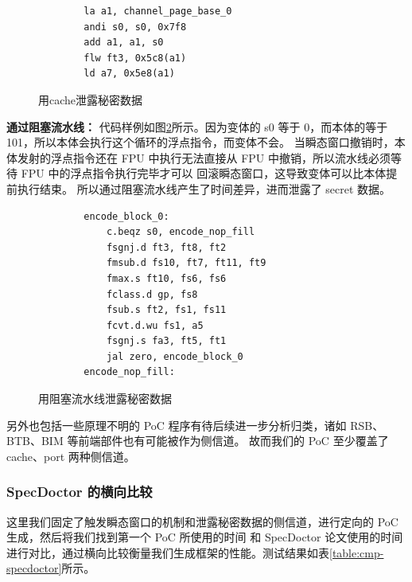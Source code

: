 \begin{figure}[htbp]
    \centering
    \begin{verbatim}
        la a1, channel_page_base_0
        andi s0, s0, 0x7f8
        add a1, a1, s0
        flw ft3, 0x5c8(a1)
        ld a7, 0x5e8(a1)
    \end{verbatim}
    \caption{用cache泄露秘密数据}
    \label{code:cache-channel}
\end{figure}

\textbf{通过阻塞流水线：}
代码样例如图\ref{code:port-stall}所示。因为变体的 s0 等于 0，而本体的等于 101，所以本体会执行这个循环的浮点指令，而变体不会。
当瞬态窗口撤销时，本体发射的浮点指令还在 FPU 中执行无法直接从 FPU 中撤销，所以流水线必须等待 FPU 中的浮点指令执行完毕才可以
回滚瞬态窗口，这导致变体可以比本体提前执行结束。
所以通过阻塞流水线产生了时间差异，进而泄露了 secret 数据。\par

\begin{figure}[htbp]
    \centering
    \begin{verbatim}
        encode_block_0:
            c.beqz s0, encode_nop_fill
            fsgnj.d ft3, ft8, ft2
            fmsub.d fs10, ft7, ft11, ft9
            fmax.s ft10, fs6, fs6
            fclass.d gp, fs8
            fsub.s ft2, fs1, fs11
            fcvt.d.wu fs1, a5
            fsgnj.s fa3, ft5, ft1
            jal zero, encode_block_0
        encode_nop_fill:
    \end{verbatim}
    \caption{用阻塞流水线泄露秘密数据}
    \label{code:port-stall}
\end{figure}

另外也包括一些原理不明的 PoC 程序有待后续进一步分析归类，诸如 RSB、BTB、BIM 等前端部件也有可能被作为侧信道。
故而我们的 PoC 至少覆盖了 cache、port 两种侧信道。\par

\subsubsection{SpecDoctor 的横向比较}

这里我们固定了触发瞬态窗口的机制和泄露秘密数据的侧信道，进行定向的 PoC 生成，然后将我们找到第一个 PoC 所使用的时间
和 SpecDoctor 论文使用的时间进行对比，通过横向比较衡量我们生成框架的性能。测试结果如表\ref{table:cmp-specdoctor}所示。\par

